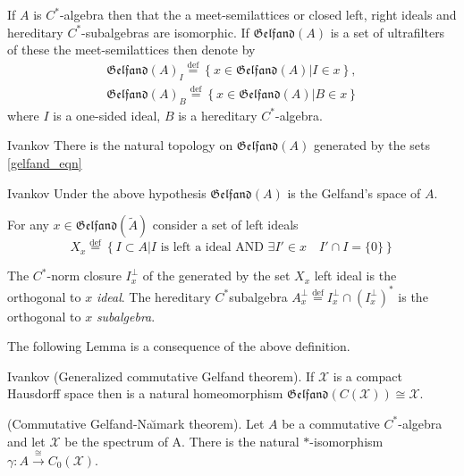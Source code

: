 \documentclass{beamer}
\theoremstyle{plain}
\newcommand{\be}{\begin{equation}}
\newcommand{\ee}{\end{equation}}
\newcommand{\sX}{\mathcal{X}}       %
\newcommand{\bydef}{\stackrel{\mathrm{def}}{=}}
\begin{document}
\begin{frame}
	
	If $A$ is $C^*$-algebra then  that the a meet-semilattices  or closed left, right ideals and hereditary $C^*$-subalgebras are isomorphic.
If  $\mathfrak{Gelfand}\left(A \right)$  is a set of ultrafilters of these the meet-semilattices then denote by
\be\label{gelfand_eqn}
\begin{split}
	\mathfrak{Gelfand}\left(A \right)_{I} \bydef \left\{\left. x \in \mathfrak{Gelfand}\left(A \right)\right| I \in x\right\},\\
	\mathfrak{Gelfand}\left(A \right)_{B} \bydef \left\{\left. x \in \mathfrak{Gelfand}\left(A \right)\right| B \in x\right\}
\end{split}
\ee
where $I$ is a one-sided ideal, $B$ is a hereditary $C^*$-algebra.	
\begin{lemma}\alert{Ivankov}
	There is the natural topology on  $\mathfrak{Gelfand}\left(A \right)$ generated by the sets \eqref{gelfand_eqn}
\end{lemma}
	\begin{definition}\label{gelfand_space_defn}\alert{Ivankov}
	Under the above hypothesis $\mathfrak{Gelfand}\left(A \right)$ is the \alert{Gelfand's space} of $A$.
\end{definition}

\end{frame}

\begin{frame}

	For any $x \in 	\mathfrak{Gelfand}\left( \widetilde A\right)$ consider a set of left ideals 
	$$
	X_x \bydef \left\{ I \subset A \left| I \text{ is left a ideal AND } \exists I' \in x \quad I'\cap I =\{0\} \right.\right\}
	$$

\begin{definition}\label{orthogonal_defn}\label{Ivankov}
	The $C^*$-norm closure $I^\perp_x$ of the generated by the set $X_x$ left ideal  is the \alert{orthogonal to} $x$ \textit{ideal}.
	The hereditary $C^*$subalgebra $A^\perp_x \bydef I^\perp_x\cap \left( I^\perp_x\right)^*$	is  the \alert{orthogonal to} $x$ \textit{subalgebra}.
	\end{definition}
	The following Lemma is a consequence of the above definition.
		\begin{lemma}\alert{Ivankov} (Generalized commutative Gelfand theorem). 
		If $\sX$ is a compact Hausdorff space then  is a natural  homeomorphism $\mathfrak{Gelfand}\left(C\left( \sX\right)  \right)\cong \sX$.
	\end{lemma}
\end{frame}
\begin{frame}
	\begin{theorem}\label{gelfand-naimark_thm} (Commutative Gelfand-Na\u{\i}mark theorem). 
		Let $A$ be a commutative $C^*$-algebra and let $\mathcal{X}$ be the spectrum of A. There is the natural $*$-isomorphism $\gamma:A \xrightarrow{\cong} C_0(\mathcal{X})$.
	\end{theorem}
	
	

\end{frame}
\end{document}
